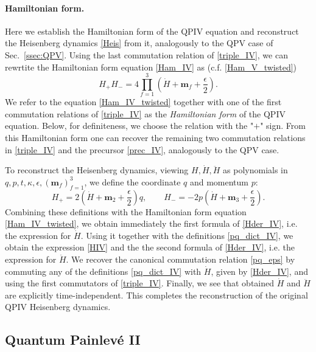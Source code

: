 \documentclass[12pt,a4paper]{article}
\numberwithin{equation}{section}
\begin{document}
\paragraph{Hamiltonian form.}
Here we establish the Hamiltonian form of the QPIV equation and reconstruct the Heisenberg dynamics \eqref{Heis} from it, analogously to the QPV case of Sec.~\ref{ssec:QPV}.
Using the last commutation relation of \eqref{triple_IV}, we can rewrtite the Hamiltonian form equation \eqref{Ham_IV} as (c.f. \eqref{Ham_V_twisted})
\begin{equation}\label{Ham_IV_twisted}
H_+H_-=4\prod_{f=1}^3\left(\dot{H}{+}\boldsymbol{m}_f{+}\frac{\epsilon}2\right).
\end{equation}
We refer to the equation \eqref{Ham_IV_twisted} together with one of the first commutation relations of \eqref{triple_IV} as the \textit{Hamiltonian form} of the QPIV equation. Below, for definiteness, we choose the relation with the "$+$" sign. From this Hamiltonian form one can recover the remaining two commutation relations in \eqref{triple_IV} and the precursor \eqref{prec_IV}, analogously to the QPV case.

To reconstruct the Heisenberg dynamics, viewing $H,\dot{H},\ddot{H}$ as polynomials in $q,p,t,\kappa,\epsilon,(\boldsymbol{m}_f)_{f=1}^3$, we define the coordinate $q$ and momentum $p$:
\begin{equation}\label{pq_dict_IV}
H_+=2\left(\dot{H}{+}\boldsymbol{m}_2{+}\frac{\epsilon}2\right)q, \qquad H_-=-2p\left(\dot{H}{+}\boldsymbol{m}_3{+}\frac{\epsilon}2\right).
\end{equation}
Combining these definitions with the Hamiltonian form equation \eqref{Ham_IV_twisted}, we obtain immediately the first formula of \eqref{Hder_IV}, i.e. the expression for $\dot{H}$. Using it together with the definitions \eqref{pq_dict_IV}, we obtain the expression \eqref{HIV} and the the second formula of \eqref{Hder_IV}, i.e. the expression for $\ddot{H}$. We recover the canonical commutation relation \eqref{pq_eps} by commuting any of the definitions \eqref{pq_dict_IV} with $\dot{H}$, given by \eqref{Hder_IV}, and using the first commutators of \eqref{triple_IV}. Finally, we see that obtained $\dot{H}$ and $\ddot{H}$ are explicitly time-independent. This completes the reconstruction of the original QPIV Heisenberg dynamics.
 
\subsection{Quantum Painlev\'e II}
\end{document}
